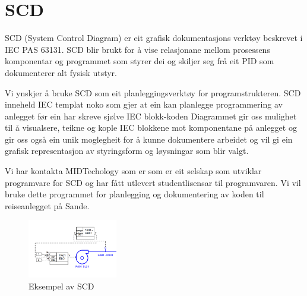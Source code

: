 \section{SCD}
\thispagestyle{fancy}


 \gls{SCD} (System Control Diagram) er eit grafisk dokumentasjons verktøy beskrevet i IEC PAS 63131. \newline
 \gls{SCD} blir brukt for å vise relasjonane mellom prosessens komponentar og programmet som styrer dei og skiljer seg frå eit \gls{PID}
 som dokumenterer alt fysisk utstyr.

 Vi ynskjer å bruke SCD som eit planleggingsverktøy for programstrukteren. SCD inneheld IEC templat noko som gjer at ein kan
 planlegge programmering av anlegget før ein har skreve sjølve IEC blokk-koden
 Diagrammet gir oss mulighet til å visualsere, teikne og kople IEC blokkene mot komponentane på anlegget og 
 gir oss også ein unik moglegheit for å kunne dokumentere arbeidet og vil gi ein grafisk representasjon
 av styringsform og løysningar som blir valgt.

 Vi har kontakta MIDTechology\citep{MIDT} som er som er eit selskap som utviklar programvare for SCD og har fått utlevert studentlisensar
 til programvaren. Vi vil bruke dette programmet for planlegging og dokumentering av koden til reiseanlegget på Sande.

 \begin{figure}[htbp]
    \centering
    \includegraphics[width=0.35\textwidth]{Bilder/Visio_eksempel.png}
    \caption{Eksempel av SCD}\label{fig:SCD eksempel}    
\end{figure}

\newpage